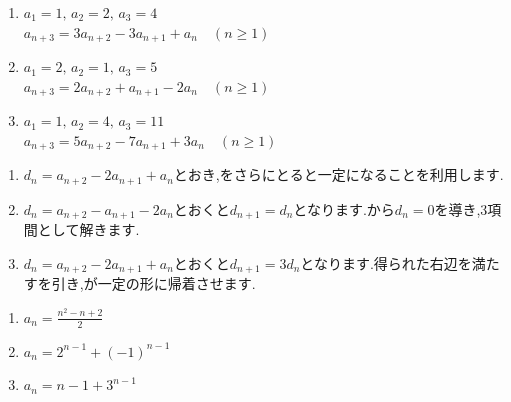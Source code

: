   \noindent {}\par\nobreak
  \begin{enumerate}[label=(\arabic*),parsep=3pt,format=\bookitemlink{example-four-term-1}{problem}{answer}]
    \item $\displaystyle a_1=1,\,a_2=2,\,a_3=4$\\
          $a_{n+3}=3a_{n+2}-3a_{n+1}+a_n\quad(n\ge1)$
    \item $\displaystyle a_1=2,\,a_2=1,\,a_3=5$\\
          $a_{n+3}=2a_{n+2}+a_{n+1}-2a_n\quad(n\ge1)$
    \item $\displaystyle a_1=1,\,a_2=4,\,a_3=11$\\
          $a_{n+3}=5a_{n+2}-7a_{n+1}+3a_n\quad(n\ge1)$
  \end{enumerate}

  \noindent{}\par\nobreak
  \begin{enumerate}[label=(\arabic*),parsep=3pt,format=\bookitemlink{example-four-term-1}{hint}{problem}]
    \item $d_n=a_{n+2}-2a_{n+1}+a_n$とおき,をさらにとると一定になることを利用します.
    \item $d_n=a_{n+2}-a_{n+1}-2a_n$とおくと$d_{n+1}=d_n$となります.から$d_n=0$を導き,3項間として解きます.
    \item $d_n=a_{n+2}-2a_{n+1}+a_n$とおくと$d_{n+1}=3d_n$となります.得られた右辺を満たすを引き,が一定の形に帰着させます.
  \end{enumerate}

  \noindent{}\par\nobreak
  \begin{enumerate}[label=(\arabic*),parsep=3pt,format=\bookitemlink{example-four-term-1}{answer}{problem}]
    \item $\displaystyle a_n=\frac{n^2-n+2}{2}$
    \item $\displaystyle a_n=2^{n-1}+(-1)^{n-1}$
    \item $\displaystyle a_n=n-1+3^{n-1}$
  \end{enumerate}

